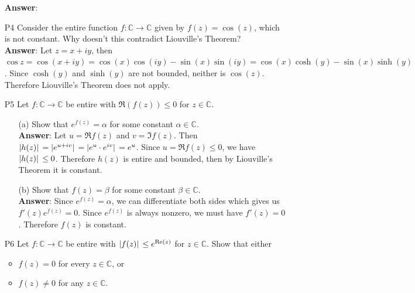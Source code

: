 \documentclass{article}
\begin{document}
\begin{itemize}
          \textbf{Answer}: 
    \item [P4] Consider the entire function $f:\mathbb{C}\rightarrow\mathbb{C}$ given by $f(z)=\cos(z)$, which is not constant. Why doesn't this contradict Liouville's Theorem?\\
          \textbf{Answer}: Let $z=x+iy$, then $\cos z=\cos(x+iy)=\cos(x)\cos(iy)-\sin(x)\sin(iy)=\cos(x)\cosh(y)-\sin(x)\sinh(y)$. Since $\cosh(y)$ and $\sinh(y)$ are not bounded, neither is $\cos(z)$. Therefore Liouville's Theorem does not apply.
    \item [P5] Let $f:\mathbb{C}\rightarrow\mathbb{C}$ be entire with $\Re(f(z))\leq 0$ for $z\in\mathbb{C}$.
          \begin{itemize}
              \item [(a)] Show that $e^{f(z)}=\alpha$ for some constant $\alpha\in\mathbb{C}$.\\
                    \textbf{Answer}: Let $u=\Re f(z)$ and $v=\Im f(z)$. Then $\abs*{h(z)}=\abs*{e^{u+iv}}=\abs*{e^u\cdot e^{iv}}=e^u$. Since $u=\Re f(z)\leq 0$, we have $\abs*{h(z)}\leq 0$. Therefore $h(z)$ is entire and bounded, then by Liouville's Theorem it is constant.
              \item [(b)] Show that $f(z)=\beta$ for some constant $\beta\in\mathbb{C}$.\\
                    \textbf{Answer}: Since $e^{f(z)}=\alpha$, we can differentiate both sides which gives us $f'(z)e^{f(z)}=0$. Since $e^{f(z)}$ is always nonzero, we must have $f'(z)=0$. Therefore $f(z)$ is constant.
          \end{itemize}
    \item [P6] Let $f:\mathbb{C}\rightarrow\mathbb{C}$ be entire with $\abs*{f(z)}\leq e^{\Re(z)}$ for $z\in\mathbb{C}$. Show that either
          \begin{itemize}
              \item $f(z)=0$ for every $z\in\mathbb{C}$, or
              \item $f(z)\neq 0$ for any $z\in\mathbb{C}$.
          \end{itemize}
\end{itemize}
\end{document}
